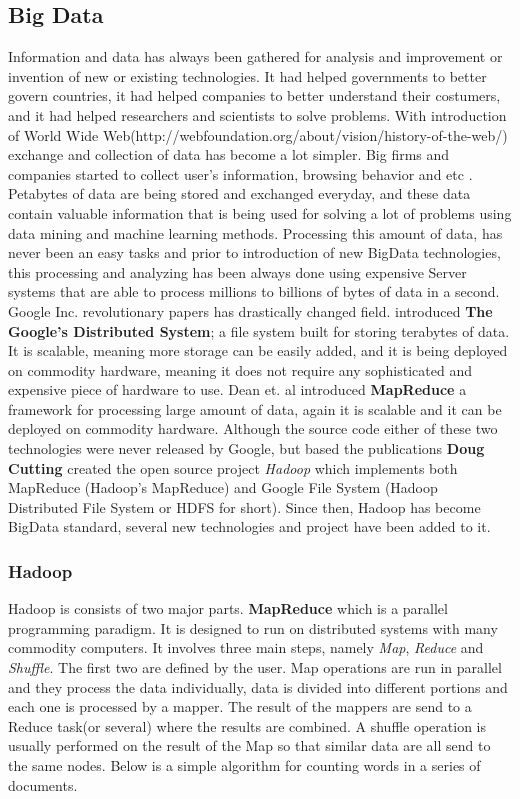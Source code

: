 \documentclass[english]{tktltiki}
\begin{document}
\subsection{Big Data}
Information and data has always been gathered for analysis and improvement or invention of new or existing technologies. It had helped governments to better govern countries, it had helped companies to better understand their costumers, and it had helped researchers and scientists to solve problems. With introduction of World Wide Web(http://webfoundation.org/about/vision/history-of-the-web/) exchange and collection of data has become a lot simpler. Big firms and companies started to collect user's information, browsing behavior and etc . Petabytes of data are being stored and exchanged everyday, and these data contain valuable information that is being used for solving a lot of problems using data mining and machine learning methods. 
Processing this amount of data, has never been an easy tasks and prior to introduction of new BigData technologies, this processing and analyzing has been always done using expensive Server systems that are able to process millions to billions of bytes of data in a second. 
Google Inc. revolutionary papers has drastically changed field. \cite{ghemawat03} introduced \textbf{The Google's Distributed System}; a file system built for storing terabytes of data. It is scalable, meaning more storage can be easily added, and it is being deployed on commodity hardware, meaning it does not require any sophisticated and expensive piece of hardware to use. Dean et. al \cite{dean04} introduced \textbf{MapReduce} a framework for processing large amount of data, again it is scalable and it can be deployed on commodity hardware. 
Although the source code either of these two technologies were never released by Google, but based the publications \textbf{Doug Cutting} created the open source project \textit{Hadoop} which implements both MapReduce (Hadoop's MapReduce) and Google File System (Hadoop Distributed File System or HDFS for short). Since then, Hadoop has become BigData standard, several new technologies and project have been added to it.

\subsubsection{Hadoop}
Hadoop is consists of two major parts. 
\textbf{MapReduce} which is a parallel programming paradigm. It is designed to run on distributed systems with many commodity computers. It involves three main steps, namely \textit{Map}, \textit{Reduce} and \textit{Shuffle}. The first two are defined by the user. Map operations are run in parallel and they process the data individually, data is divided into different portions and each one is processed by a mapper. The result of the mappers are send to a Reduce task(or several) where the results are combined. A shuffle operation is usually performed on the result of the Map so that similar data are all send to the same nodes. Below is a simple algorithm for counting words in a series of documents. 
\end{document}
